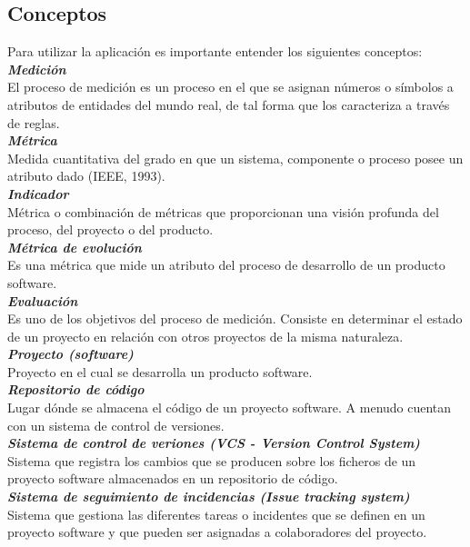 \subsection{Conceptos}
Para utilizar la aplicación es importante entender los siguientes conceptos:\\
\textbf{\textit{Medición}}\\
El proceso de medición es un proceso en el que se asignan números o símbolos a atributos de entidades del mundo real, de tal forma que los caracteriza a través de reglas.\\
\textbf{\textit{Métrica}}\\
Medida cuantitativa del grado en que un sistema, componente o proceso posee un atributo dado (IEEE, 1993).\\
\textbf{\textit{Indicador}}\\
Métrica o combinación de métricas que proporcionan una visión profunda del proceso, del proyecto o del producto.\\
\textbf{\textit{Métrica de evolución}}\\
Es una métrica que mide un atributo del proceso de desarrollo de un producto software.\\
\textbf{\textit{Evaluación}}\\
Es uno de los objetivos del proceso de medición. Consiste en determinar el estado de un proyecto en relación con otros proyectos de la misma naturaleza.\\
\textbf{\textit{Proyecto (software)}}\\
Proyecto en el cual se desarrolla un producto software.\\
\textbf{\textit{Repositorio de código}}\\
Lugar dónde se almacena el código de un proyecto software. A menudo cuentan con un sistema de control de versiones.\\
\textbf{\textit{Sistema de control de veriones (VCS - Version Control System)}}\\
Sistema que registra los cambios que se producen sobre los ficheros de un proyecto software almacenados en un repositorio de código.\\
\textbf{\textit{Sistema de seguimiento de incidencias (Issue tracking system)}}\\
Sistema que gestiona las diferentes tareas o incidentes que se definen en un proyecto software y que pueden ser asignadas a colaboradores del proyecto.


